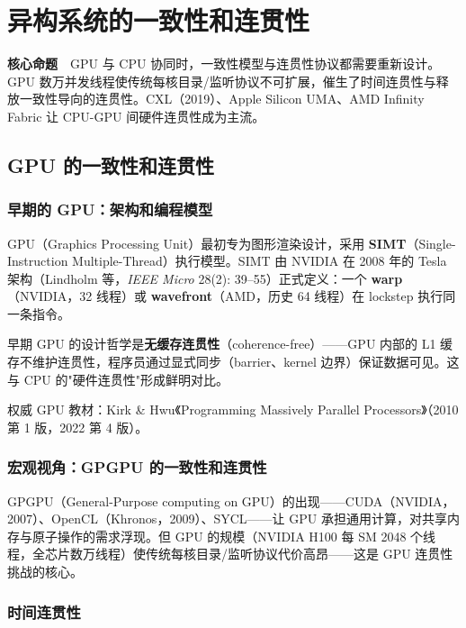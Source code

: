 \chapter{异构系统的一致性和连贯性}

\begin{epigraph}
\textbf{核心命题}　GPU 与 CPU 协同时，一致性模型与连贯性协议都需要重新设计。GPU 数万并发线程使传统每核目录/监听协议不可扩展，催生了时间连贯性与释放一致性导向的连贯性。CXL（2019）、Apple Silicon UMA、AMD Infinity Fabric 让 CPU-GPU 间硬件连贯性成为主流。
\end{epigraph}



\section{GPU 的一致性和连贯性}

\subsection{早期的 GPU：架构和编程模型}

GPU（Graphics Processing Unit）最初专为图形渲染设计，采用 \textbf{SIMT}（Single-Instruction Multiple-Thread）执行模型。SIMT 由 NVIDIA 在 2008 年的 Tesla 架构（Lindholm 等，\emph{IEEE Micro} 28(2): 39–55）正式定义：一个 \textbf{warp}（NVIDIA，32 线程）或 \textbf{wavefront}（AMD，历史 64 线程）在 lockstep 执行同一条指令。

早期 GPU 的设计哲学是\textbf{无缓存连贯性}（coherence-free）——GPU 内部的 L1 缓存不维护连贯性，程序员通过显式同步（barrier、kernel 边界）保证数据可见。这与 CPU 的"硬件连贯性"形成鲜明对比。

权威 GPU 教材：Kirk \& Hwu《Programming Massively Parallel Processors》（2010 第 1 版，2022 第 4 版）。

\subsection{宏观视角：GPGPU 的一致性和连贯性}

GPGPU（General-Purpose computing on GPU）的出现——CUDA（NVIDIA，2007）、OpenCL（Khronos，2009）、SYCL——让 GPU 承担通用计算，对共享内存与原子操作的需求浮现。但 GPU 的规模（NVIDIA H100 每 SM 2048 个线程，全芯片数万线程）使传统每核目录/监听协议代价高昂——这是 GPU 连贯性挑战的核心。

\subsection{时间连贯性}

